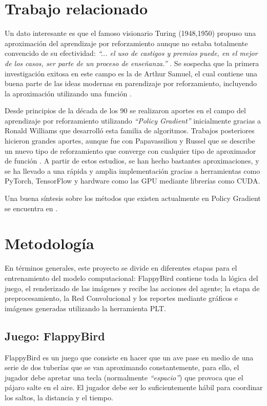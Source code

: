 \documentclass[journal]{IEEEtran}
\begin{document}
\section{Trabajo relacionado}
    Un dato interesante es que el famoso visionario Turing (1948,1950) propuso una aproximación del aprendizaje por reforzamiento aunque no estaba totalmente convencido de su efectividad: \emph{``... el uso de castigos y premios puede, en el mejor de los casos, ser parte de un proceso de enseñanza.''} \cite{Turing1948,Turing1950}. Se sospecha que la primera investigación exitosa en este campo es la de Arthur Samuel, el cual contiene una buena parte de las ideas modernas en parendizaje por reforzamiento, incluyendo la aproximación utilizando una función \cite{Rusell2010}.

    Desde principios de la década de los 90 se realizaron aportes en el campo del aprendizaje por reforzamiento utilizando \emph{``Policy Gradient''} inicialmente gracias a Ronald Williams que desarrolló esta familia de algoritmos. Trabajos posteriores hicieron grandes aportes, aunque fue con Papavassiliou y Russel que se describe un nuevo tipo de reforzamiento que converge con cualquier tipo de aproximador de función \cite{Papavassiliou1999}. A partir de estos estudios, se han hecho bastantes aproximaciones, y se ha llevado a una rápida y amplia implementación gracias a herramientas como PyTorch, TensorFlow y hardware como las GPU mediante librerías como CUDA.

    Una buena síntesis sobre los métodos que existen actualmente en Policy Gradient se encuentra en \cite{Peters2010}.

\section{Metodología}
    En términos generales, este proyecto se divide en diferentes etapas para el entrenamiento del modelo computacional: FlappyBird contiene toda la lógica del juego, el renderizado de las imágenes y recibe las acciones del agente; la etapa de preprocesamiento, la Red Convolucional y los reportes mediante gráficos e imágenes generadas utilizando la herramienta PLT.
\subsection{Juego: FlappyBird}
    FlappyBird es un juego que consiste en hacer que un ave pase en medio de una serie de dos tuberías que se van aproximando constantemente, para ello, el jugador debe apretar una tecla (normalmente \emph{``espacio''}) que provoca que el pájaro salte en el aire. El jugador debe ser lo suficientemente hábil para coordinar los saltos, la distancia y el tiempo. 
\end{document}
